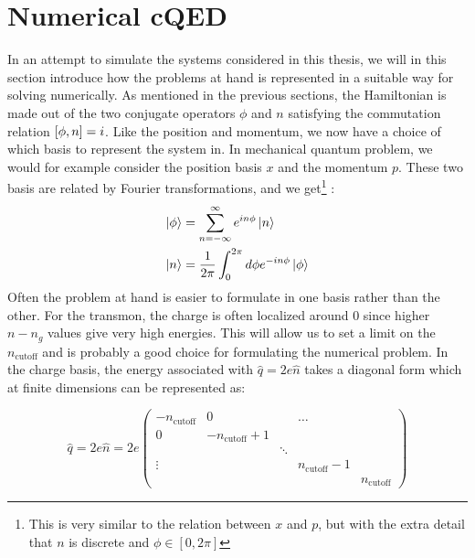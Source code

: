 \section{Numerical cQED}
In an attempt to simulate the systems considered in this thesis, we will in this section introduce how the problems at hand is represented in a suitable way for solving numerically. As mentioned in the previous sections, the Hamiltonian is made out of the two conjugate operators $\phi$ and $n$ satisfying the commutation relation $\comm{\phi}{n} = i$. Like the position and momentum, we now have a choice of which basis to represent the system in. In mechanical quantum problem, we would for example consider the position basis ${x}$ and the momentum $p$. These two basis are related by Fourier transformations, and we get\footnote{This is very similar to the relation between $x$ and $p$, but with the extra detail that $n$ is discrete and $\phi\in[0, 2\pi]$}  \cite{langford_circuit_2013}:
\begin{align}
    \ket{\phi} &= \sum_{n=-\infty}^\infty e^{in\phi}\ket{n} \\
    \ket{n} &= \frac{1}{2\pi} \int_0^{2\pi}d\phi e^{-in\phi}\ket{\phi}
\end{align}
Often the problem at hand is easier to formulate in one basis rather than the other. For the transmon, the charge is often localized around 0 since higher $n- n_g$ values give very high energies. This will allow us to set a limit on the $n_{\text{cutoff}}$ and is probably a good choice for formulating the numerical problem. In the charge basis, the energy associated with $\hat{q} = 2e\hat{n}$ takes a diagonal form which at finite dimensions can be represented as:

\begin{fullwidth}
\begin{equation}
    \hat{q} =  2 e \hat{n} = 2 e \begin{pmatrix}
-n_{\text{cutoff}} & 0 &  & \ldots &  \\
0 & -n_{\text{cutoff}}+1 &  &  &  \\
 &  & \ddots &  &  \\
\vdots &  &  & n_{\text{cutoff}}-1 &  \\
 &  &  &  & n_{\text{cutoff}} 
\end{pmatrix}
\end{equation} 
\end{fullwidth}

